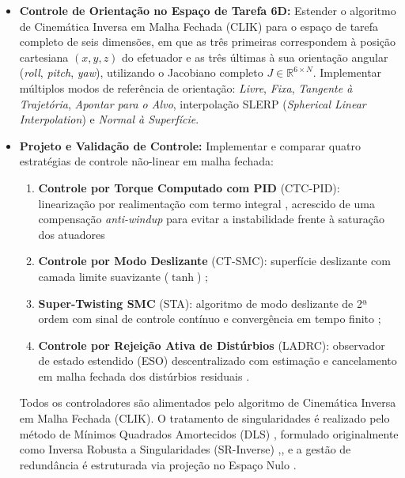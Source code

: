 \begin{itemize}
    \item \textbf{Controle de Orientação no Espaço de Tarefa 6D:} Estender o algoritmo de Cinemática Inversa em Malha Fechada (CLIK) para o espaço de tarefa completo de seis dimensões, em que as três primeiras correspondem à posição cartesiana $(x, y, z)$ do efetuador e as três últimas à sua orientação angular (\textit{roll}, \textit{pitch}, \textit{yaw}), utilizando o Jacobiano completo $J \in \mathbb{R}^{6 \times N}$. Implementar múltiplos modos de referência de orientação: \textit{Livre}, \textit{Fixa}, \textit{Tangente à Trajetória}, \textit{Apontar para o Alvo}, interpolação SLERP (\textit{Spherical Linear Interpolation}) \cite{shoemake1985animating} e \textit{Normal à Superfície}.

    \item \textbf{Projeto e Validação de Controle:} Implementar e comparar quatro estratégias de controle não-linear em malha fechada:
    \begin{enumerate}
        \item \textbf{Controle por Torque Computado com PID} (CTC-PID): linearização por realimentação com termo integral \cite{craig1989introduction}, acrescido de uma compensação \textit{anti-windup} para evitar a instabilidade frente à saturação dos atuadores \cite{ogata2010modern}
        \item \textbf{Controle por Modo Deslizante} (CT-SMC): superfície deslizante \cite{slotine1991applied} com camada limite suavizante ($\tanh$) \cite{burton1986continuous};
        \item \textbf{Super-Twisting SMC} (STA): algoritmo de modo deslizante de 2ª ordem com sinal de controle contínuo e convergência em tempo finito \cite{levant1993sliding, moreno2012strict};
        \item \textbf{Controle por Rejeição Ativa de Distúrbios} (LADRC): observador de estado estendido (ESO) descentralizado com estimação e cancelamento em malha fechada dos distúrbios residuais \cite{han2009pid}.
    \end{enumerate}
    Todos os controladores são alimentados pelo algoritmo de Cinemática Inversa em Malha Fechada (CLIK). O tratamento de singularidades é realizado pelo método de Mínimos Quadrados Amortecidos (DLS) , formulado originalmente como Inversa Robusta a Singularidades (SR-Inverse) \cite{nakamura1986inverse} ,, e a gestão de redundância é estruturada via projeção no Espaço Nulo \cite{chiaverini1997singularity}.
\end{itemize}

